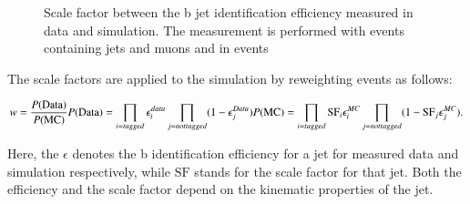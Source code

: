 \begin{figure}[htbp!]
  \begin{center}
\caption{Scale factor between the b jet identification efficiency measured in data and simulation. The measurement is performed with events containing jets and muons and in \ttbar events \cite{CMS-DP-2017-012}
  \label{fig:reco_btagsf}}
  \end{center}
\end{figure}

The scale factors are applied to the simulation by reweighting events as follows:

\begin{equation}
w = \frac{P(\mathrm{Data})}{P(\mathrm{MC})} \vspace{0.1cm} P(\mathrm{Data}) = \prod_{i=tagged} \epsilon_i^{data} \prod_{j=not tagged} (1-\epsilon_j^{Data}) \vspace{0.1cm} P(\mathrm{MC}) = \prod_{i=tagged} \mathrm{SF}_i\epsilon_i^{MC} \prod_{j=not tagged} (1-\mathrm{SF}_j\epsilon_j^{MC}).
\end{equation}

Here, the $\epsilon$ denotes the b identification efficiency for a jet for measured data and simulation respectively, while $\mathrm{SF}$ stands for the scale factor for that jet.
Both the efficiency and the scale factor depend on the kinematic properties of the jet.

